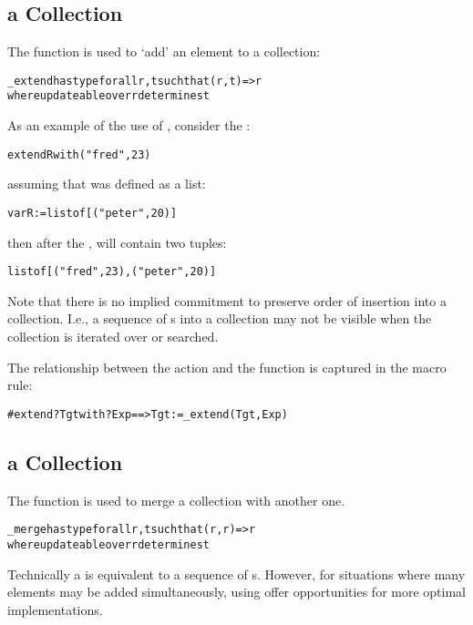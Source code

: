 \subsection{ a Collection}
\label{extend}
The  function is used to `add' an element to a collection:
\begin{alltt}
\_extend has type for all r,t such that (r,t)=>r
                  where updateable over r determines t
\end{alltt}

As an example of the use of , consider the :
\begin{alltt}
extend R with ("fred",23)
\end{alltt}
assuming that  was defined as a list:
\begin{alltt}
var R := list of [ ("peter",20) ]
\end{alltt}
then after the ,  will contain two tuples:
\begin{alltt}
list of [ ("fred", 23), ("peter",20) ]
\end{alltt}

\begin{aside}
Note that there is no implied commitment to preserve order of insertion into a collection. I.e., a sequence of s into a collection may not be visible when the collection is iterated over or searched.
\end{aside}

The relationship between the  action and the  function is captured in the macro rule:
\begin{alltt}
#extend ?Tgt with ?Exp ==> Tgt := \_extend(Tgt,Exp)
\end{alltt}


\subsection{ a Collection}
\label{merge}
The  function is used to merge a collection with another one.
\begin{alltt}
\_merge has type for all r,t such that (r,r)=>r
                 where updateable over r determines t
\end{alltt}

\begin{aside}
Technically a  is equivalent to a sequence of s. However, for situations where many elements may be added simultaneously, using  offer opportunities for more optimal implementations.
\end{aside}

